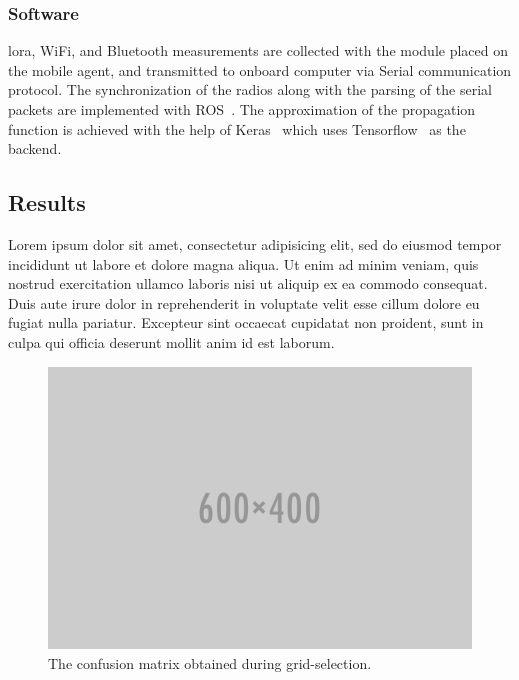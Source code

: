     \subsubsection{Software}
    \gls{lora}, WiFi, and Bluetooth measurements are collected with the module placed on the mobile agent, and transmitted to onboard computer via Serial communication protocol.
    The synchronization of the radios along with the parsing of the serial packets are implemented with ROS~\cite{quigley2009ros}.
    The approximation of the propagation function is achieved with the help of Keras~\cite{chollet2015} which uses Tensorflow~\cite{tensorflow2015-whitepaper} as the backend.

    \subsection{Results}
    Lorem ipsum dolor sit amet, consectetur adipisicing elit, sed do eiusmod tempor incididunt ut labore et dolore magna aliqua. Ut enim ad minim veniam, quis nostrud exercitation ullamco laboris nisi ut aliquip ex ea commodo consequat. Duis aute irure dolor in reprehenderit in voluptate velit esse cillum dolore eu fugiat nulla pariatur. Excepteur sint occaecat cupidatat non proident, sunt in culpa qui officia deserunt mollit anim id est laborum.

    \begin{figure}[thpb]
        \centering
        \includegraphics[width=\linewidth]{figures/placeholder.png}
        \caption{\label{fig:confussion}The confusion matrix obtained during grid-selection.}
    \end{figure}

